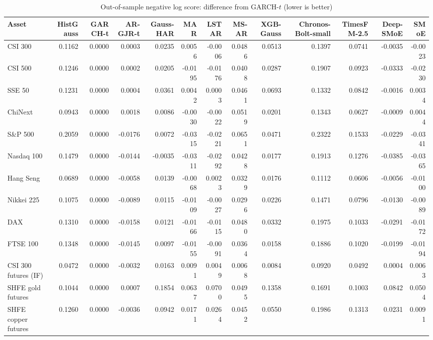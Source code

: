 \begin{table}[!htbp]\centering\scriptsize
\caption{Out-of-sample negative log score: difference from GARCH-$t$ (lower is better)}\label{tab:loss_NLL}
\begin{adjustbox}{max width=\textwidth}
\begin{tabular}{lrrrrrrrrrrrr}
\toprule
Asset & HistGauss & GARCH-t & AR-GJR-t & Gauss-HAR & MAR & LSTAR & MS-AR & XGB-Gauss & Chronos-Bolt-small & TimesFM-2.5 & Deep-SMoE & SMoE\\
\midrule
CSI 300 & 0.1162 & 0.0000 & 0.0003 & 0.0235 & 0.0056 & -0.0006 & 0.0486 & 0.0513 & 0.1397 & 0.0741 & -0.0035 & -0.0023\\
CSI 500 & 0.1246 & 0.0000 & 0.0002 & 0.0205 & -0.0195 & -0.0176 & 0.0408 & 0.0287 & 0.1907 & 0.0923 & -0.0333 & -0.0230\\
SSE 50 & 0.1231 & 0.0000 & 0.0004 & 0.0361 & 0.0042 & 0.0003 & 0.0461 & 0.0693 & 0.1332 & 0.0842 & -0.0016 & 0.0034\\
ChiNext & 0.0943 & 0.0000 & 0.0018 & 0.0086 & -0.0030 & -0.0022 & 0.0519 & 0.0201 & 0.1343 & 0.0627 & -0.0009 & 0.0044\\
S\&P 500 & 0.2059 & 0.0000 & -0.0176 & 0.0072 & -0.0315 & -0.0221 & 0.0651 & 0.0471 & 0.2322 & 0.1533 & -0.0229 & -0.0341\\
Nasdaq 100 & 0.1479 & 0.0000 & -0.0144 & -0.0035 & -0.0311 & -0.0292 & 0.0428 & 0.0177 & 0.1913 & 0.1276 & -0.0385 & -0.0365\\
Hang Seng & 0.0689 & 0.0000 & -0.0058 & 0.0139 & -0.0068 & 0.0023 & 0.0329 & 0.0176 & 0.1112 & 0.0606 & -0.0056 & -0.0100\\
Nikkei 225 & 0.1075 & 0.0000 & -0.0089 & 0.0115 & -0.0109 & -0.0027 & 0.0296 & 0.0226 & 0.1471 & 0.0796 & -0.0130 & -0.0089\\
DAX & 0.1310 & 0.0000 & -0.0158 & 0.0121 & -0.0166 & -0.0115 & 0.0480 & 0.0332 & 0.1975 & 0.1033 & -0.0291 & -0.0172\\
FTSE 100 & 0.1348 & 0.0000 & -0.0145 & 0.0097 & -0.0155 & -0.0091 & 0.0364 & 0.0158 & 0.1886 & 0.1020 & -0.0199 & -0.0194\\
CSI 300 futures (IF) & 0.0472 & 0.0000 & -0.0032 & 0.0163 & 0.0091 & 0.0049 & 0.0068 & 0.0084 & 0.0920 & 0.0492 & 0.0004 & 0.0063\\
SHFE gold futures & 0.1044 & 0.0000 & 0.0007 & 0.1854 & 0.0637 & 0.0700 & 0.0495 & 0.1358 & 0.1691 & 0.1003 & 0.0842 & 0.0504\\
SHFE copper futures & 0.1260 & 0.0000 & -0.0036 & 0.0942 & 0.0171 & 0.0264 & 0.0452 & 0.0550 & 0.1986 & 0.1313 & 0.0231 & 0.0091\\

\end{tabular}
\end{adjustbox}
\end{table}
